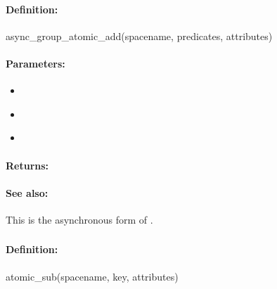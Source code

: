 \paragraph{Definition:}
\begin{rubycode}
async_group_atomic_add(spacename, predicates, attributes)
\end{rubycode}

\paragraph{Parameters:}
\begin{itemize}[noitemsep]
\item {}\\

\item {}\\

\item {}\\

\end{itemize}

\paragraph{Returns:}


\paragraph{See also:}  This is the asynchronous form of .

\pagebreak
\subsubsection{}
\label{api:ruby:atomic_sub}


\paragraph{Definition:}
\begin{rubycode}
atomic_sub(spacename, key, attributes)
\end{rubycode}

